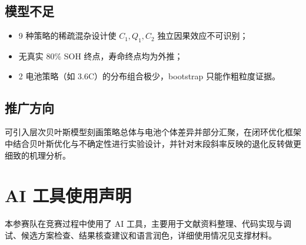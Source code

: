 \documentclass[withoutpreface,bwprint]{cumcmthesis}
\begin{document}
\subsection{模型不足}
\begin{itemize}
\item 9 种策略的稀疏混杂设计使 $C_1,Q_1,C_2$ 独立因果效应不可识别；
\item 无真实 80\% SOH 终点，寿命终点均为外推；
\item 2 电池策略（如 3.6C）的分布组合极少，bootstrap 只能作粗粒度证据。
\end{itemize}
\subsection{推广方向}
可引入层次贝叶斯模型刻画策略总体与电池个体差异并部分汇聚，在闭环优化框架中结合贝叶斯优化与不确定性进行实验设计，并针对末段斜率反映的退化反转做更细致的机理分析。

\section*{AI 工具使用声明}
本参赛队在竞赛过程中使用了 AI 工具，主要用于文献资料整理、代码实现与调试、候选方案检查、结果核查建议和语言润色，详细使用情况见支撑材料。
\end{document}
